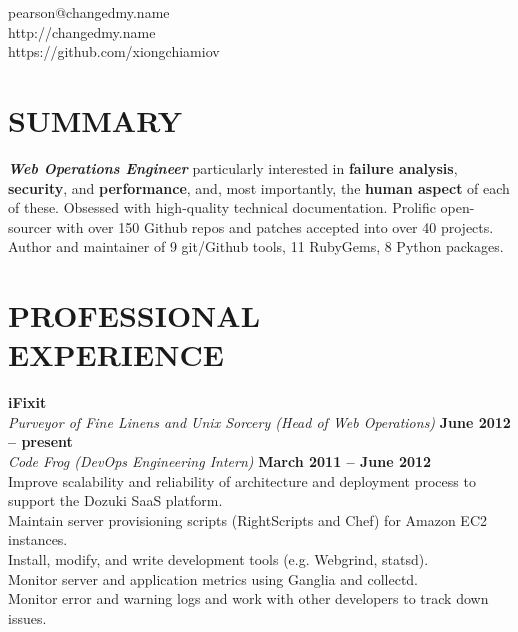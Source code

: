 \documentclass[margin,line]{resume}
\begin{document}
{
    \sc
    \hfill pearson@changedmy.name           \vspace{0mm}\\\vspace{0mm}%
    \hfill http://changedmy.name            \vspace{0mm}\\\vspace{0mm}%
    \hfill https://github.com/xiongchiamiov \vspace{0mm}\\\vspace{-9mm}%
}

\begin{resume}

\vspace{6mm}

    \section{\mysidestyle \textbf{\large{S}\small{UMMARY}}}

    \textbf{\textsl{Web Operations Engineer}} particularly interested in \textbf{failure analysis}, \textbf{security}, and \textbf{performance}, and, most importantly, the \textbf{human aspect} of each of these.  Obsessed with high-quality technical documentation.  Prolific open-sourcer with over 150 Github repos and patches accepted into over 40 projects.  Author and maintainer of 9 git/Github tools, 11 RubyGems, 8 Python packages.

\sectionline

    \section{\mysidestyle \textbf{\large{P}\small{ROFESSIONAL\\EXPERIENCE}}}

    \textbf{\listing iFixit} \vspace{2mm}\\\vspace{1mm}%
    \textsl{Purveyor of Fine Linens and Unix Sorcery (Head of Web Operations)} \hfill \textbf{June 2012 -- present}\\
    \textsl{Code Frog (DevOps Engineering Intern)} \hfill \textbf{March 2011 -- June 2012}\\
    Improve scalability and reliability of architecture and deployment process to support the Dozuki SaaS platform.\\
    Maintain server provisioning scripts (RightScripts and Chef) for Amazon EC2 instances.\\
    Install, modify, and write development tools (e.g. Webgrind, statsd).\\
    Monitor server and application metrics using Ganglia and collectd.\\
    Monitor error and warning logs and work with other developers to track down issues.


\end{resume}
\end{document}
